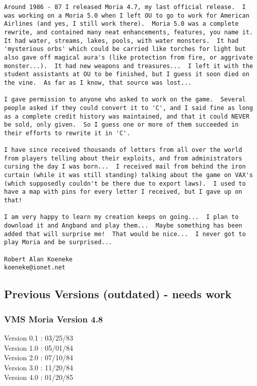 \begin{verbatim}
Around 1986 - 87 I released Moria 4.7, my last official release.  I
was working on a Moria 5.0 when I left OU to go to work for American
Airlines (and yes, I still work there).  Moria 5.0 was a complete
rewrite, and contained many neat enhancements, features, you name it.
It had water, streams, lakes, pools, with water monsters.  It had
'mysterious orbs' which could be carried like torches for light but
also gave off magical aura's (like protection from fire, or aggrivate
monster...).  It had new weapons and treasures...  I left it with the
student assistants at OU to be finished, but I guess it soon died on
the vine.  As far as I know, that source was lost...

I gave permission to anyone who asked to work on the game.  Several
people asked if they could convert it to 'C', and I said fine as long
as a complete credit history was maintained, and that it could NEVER
be sold, only given.  So I guess one or more of them succeeded in
their efforts to rewrite it in 'C'.

I have since received thousands of letters from all over the world
from players telling about their exploits, and from administrators
cursing the day I was born...  I received mail from behind the iron
curtain (while it was still standing) talking about the game on VAX's
(which supposedly couldn't be there due to export laws).  I used to
have a map with pins for every letter I received, but I gave up on
that!

I am very happy to learn my creation keeps on going...  I plan to
download it and Angband and play them...  Maybe something has been
added that will surprise me!  That would be nice...  I never got to
play Moria and be surprised...

Robert Alan Koeneke
koeneke@ionet.net
\end{verbatim}  

\subsection{Previous Versions (outdated) - needs work}
\subsubsection{VMS Moria Version 4.8}
Version 0.1  : 03/25/83\\
Version 1.0  : 05/01/84\\
Version 2.0  : 07/10/84\\
Version 3.0  : 11/20/84\\
Version 4.0  : 01/20/85

